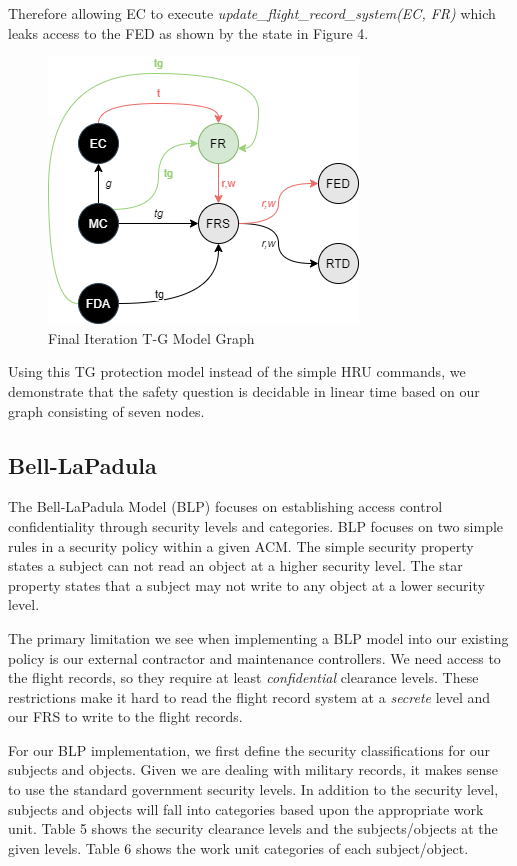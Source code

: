 \documentclass[10pt,journal,compsoc]{IEEEtran}
\begin{document}
Therefore allowing EC to execute \textit{update\_flight\_record\_system(EC, FR)} which leaks access to the FED as shown by the state in Figure 4.

\begin{figure}[t]
  \caption{Final Iteration T-G Model Graph} 
  \includegraphics[scale=0.7]{TGModel4.png}
\end{figure}

Using this TG protection model instead of the simple HRU commands, we demonstrate that the safety question is decidable in linear time based on our graph consisting of seven nodes.

\subsection{Bell-LaPadula}
The Bell-LaPadula Model (BLP) focuses on establishing access control confidentiality through security levels and categories. 
BLP focuses on two simple rules in a security policy within a given ACM. 
The simple security property states a subject can not read an object at a higher security level. 
The star property states that a subject may not write to any object at a lower security level.

The primary limitation we see when implementing a BLP model into our existing policy is our external contractor and maintenance controllers. We need access to the flight records, so they require at least \textit{confidential} clearance levels. These restrictions make it hard to read the flight record system at a \textit{secrete} level and our FRS to write to the flight records. 

For our BLP implementation, we first define the security classifications for our subjects and objects. Given we are dealing with military records, it makes sense to use the standard government security levels. In addition to the security level, subjects and objects will fall into categories based upon the appropriate work unit.  
Table 5 shows the security clearance levels and the subjects/objects at the given levels.
Table 6 shows the work unit categories of each subject/object.
\end{document}
